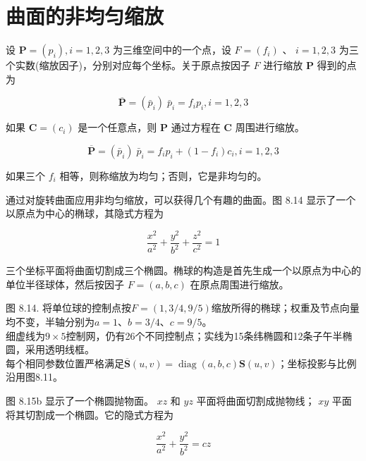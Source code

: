\documentclass[../main.tex]{subfiles}
\begin{document}
\section{曲面的非均匀缩放}
设 \(\mathbf{P} = \left( {p}_{i}\right) ,i = 1,2,3\) 为三维空间中的一个点，设 \(F = \left( {f}_{i}\right)\) 、 \(i = 1,2,3\) 为三个实数(缩放因子)，分别对应每个坐标。关于原点按因子 \(F\) 进行缩放 \(\mathbf{P}\) 得到的点为

\[
\overline{\mathbf{P}} = \left( {\bar{p}}_{i}\right) \;{\bar{p}}_{i} = {f}_{i}{p}_{i},i = 1,2,3 \tag{8.6}
\]

如果 \(\mathbf{C} = \left( {c}_{i}\right)\) 是一个任意点，则 \(\mathbf{P}\) 通过方程在 \(\mathbf{C}\) 周围进行缩放。

\[
\overline{\mathbf{P}} = \left( {\bar{p}}_{i}\right) \;{\bar{p}}_{i} = {f}_{i}{p}_{i} + \left( {1 - {f}_{i}}\right) {c}_{i},i = 1,2,3 \tag{8.7}
\]

如果三个 \({f}_{i}\) 相等，则称缩放为均匀；否则，它是非均匀的。

通过对旋转曲面应用非均匀缩放，可以获得几个有趣的曲面。图 8.14 显示了一个以原点为中心的椭球，其隐式方程为

\[
\frac{{x}^{2}}{{a}^{2}} + \frac{{y}^{2}}{{b}^{2}} + \frac{{z}^{2}}{{c}^{2}} = 1 \tag{8.8}
\]

三个坐标平面将曲面切割成三个椭圆。椭球的构造是首先生成一个以原点为中心的单位半径球体，然后按因子 \(F = \left( {a,b,c}\right)\) 在原点周围进行缩放。

\begin{center}
\begin{minipage}{26cm}
\vspace*{.6\baselineskip}
\centering
{}
\par\smallskip
图 8.14. 将单位球的控制点按$F=(1,3/4,9/5)$缩放所得的椭球；权重及节点向量均不变，半轴分别为$a=1$、$b=3/4$、$c=9/5$。\\
细虚线为$9\times5$控制网，仍有26个不同控制点；实线为15条纬椭圆和12条子午半椭圆，采用透明线框。\\
每个相同参数位置严格满足$\overline{\mathbf S}(u,v)=\operatorname{diag}(a,b,c)\mathbf S(u,v)$；坐标投影与比例沿用图8.11。
\end{minipage}
\end{center}

图 8.15b 显示了一个椭圆抛物面。 \({xz}\) 和 \({yz}\) 平面将曲面切割成抛物线； \({xy}\) 平面将其切割成一个椭圆。它的隐式方程为

\[
\frac{{x}^{2}}{{a}^{2}} + \frac{{y}^{2}}{{b}^{2}} = {cz} \tag{8.9}
\]
\end{document}
